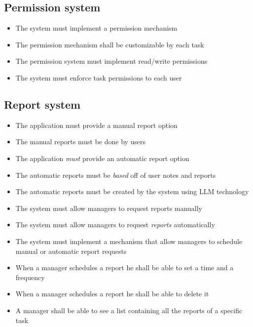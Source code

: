 \documentclass{article}
\begin{document}
\subsection{Permission system}
\begin{itemize}
    \item The system must implement a permission mechanism
    \item The permission mechanism shall be customizable by each task
    \item The permission system must implement read/write permissions
    \item The system must enforce task permissions to each user
\end{itemize}
\subsection{Report system}
\begin{itemize}
    \item The application must provide a manual report option
    \item The manual reports must be done by users
    \item The application \textit{must} provide an automatic report option
    \item The automatic reports must be \textit{based} off of user notes and reports
    \item The automatic reports must be created by the system using LLM technology
    \item The system must allow managers to request reports manually
    \item The system must allow managers to request \textit{reports} automatically
    \item The system must implement a mechanism that allow managers to schedule manual or automatic report requests
    \item When a manager schedules a report he shall be able to set a time and a frequency
    \item When a manager schedules a report he shall be able to delete it
    \item A manager shall be able to see a list containing all the reports of a specific task
\end{itemize}
\end{document}
